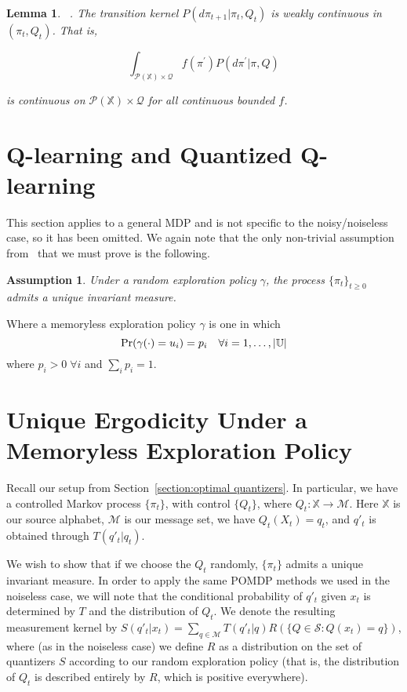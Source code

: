 \documentclass[conference]{IEEEtran}
\newtheorem{lemma}[theorem]{Lemma}
\newtheorem{assumption}{Assumption}[section]
\begin{document}
\begin{lemma}\label{lemma:weak}~\cite[Lemma 11]{Linder}.
    The transition kernel \( P(d\pi_{t+1}|\pi_t,Q_t) \) is weakly continuous in \( (\pi_t,Q_t) \). That is,

    \[ \int_{\mathcal{P}(\mathbb{X}) \times \mathcal{Q}} f(\pi^{'})P(d \pi^{'}|\pi, Q) \]

    is continuous on \( \mathcal{P}(\mathbb{X}) \times \mathcal{Q} \) for all continuous bounded \(f\).
\end{lemma}


\section{Q-learning and Quantized Q-learning}\label{section:Q-learning}
This section applies to a general MDP and is not specific to the noisy/noiseless case, so it has been omitted. We again note that the only non-trivial assumption from~\cite[Theorem 3.2]{Kara} that we must prove is the following.
\begin{assumption}
    Under a random exploration policy \(\gamma\), the process \( \{ \pi_t \}_{t\ge0} \) admits a unique invariant measure.
\end{assumption}

Where a memoryless exploration policy \( \gamma \) is one in which
\[ \textup{Pr}(\gamma(\cdot) = u_i) = p_i \quad \forall i = 1,\ldots,|\mathbb{U}| \]
where \(p_i > 0 \; \forall i\) and \(\sum_i p_i = 1\).

\section{Unique Ergodicity Under a Memoryless Exploration Policy}\label{section:unique-ergodicity}
Recall our setup from Section~\ref{section:optimal quantizers}. In particular, we have a controlled Markov process \(\{\pi_t\}\), with control \(\{Q_t\}\), where \(Q_t : \mathbb{X} \to \mathcal{M}\). Here \(\mathbb{X}\) is our source alphabet, \(\mathcal{M}\) is our message set, we have \(Q_t(X_t) = q_t\), and \(q'_t\) is obtained through \(T(q'_t | q_t)\).

We wish to show that if we choose the \(Q_t\) randomly, \( \{\pi_t\} \) admits a unique invariant measure. In order to apply the same POMDP methods we used in the noiseless case, we will note that the conditional probability of \(q'_t\) given \(x_t\) is determined by \(T\) and the distribution of \(Q_t\). We denote the resulting measurement kernel by \(S(q'_t | x_t) = \sum_{q \in \mathcal{M}}T(q'_t|q)R(\{Q \in \mathcal{S} : Q(x_t)=q\})\), where (as in the noiseless case) we define \(R\) as a distribution on the set of quantizers \(S\) according to our random exploration policy (that is, the distribution of \(Q_t\) is described entirely by \(R\), which is positive everywhere).
\end{document}
